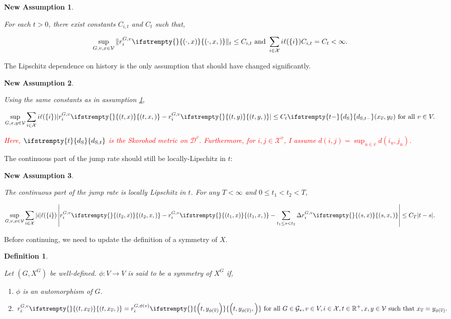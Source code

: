 \documentclass[12pt]{article}
\newcommand{\mb}{\mathbb}
\newcommand{\mc}{\mathcal}
\newcommand{\ra}{\rightarrow}
\newcommand{\ov}{\overline}
\newcommand{\te}{\text}
\newcommand{\tr}{\textcolor{red}}
\newcommand{\cad}{\mc{D}}							%
\newcommand{\valid}{\mc{V}}							%
\newcommand{\sta}{\mc{X}}							%
\newcommand{\cl}[1]{\ov{#1}}						%
\newcommand{\Xf}{X}									%
\newcommand{\Sm}{\ell}								%
\newcommand{\rate}{r}								%
\newcommand{\stmet}[1]{
\ifstrempty{#1}{
	d_{\te{S}}}{
	d_{\te{S},#1}}}									%
\newcommand{\xf}{x}									%
\newcommand{\xg}{y}									%
\newcommand{\vind}[1]{_{#1}}						%
\newcommand{\gind}[1]{^{#1}}						%
\newcommand{\stpara}[1]{_{#1}}						%
\newcommand{\gvpara}[2]{^{#1,#2}}					%
\newcommand{\jumpbd}[1]{C_{#1}}						%
\newcommand{\jumpibd}[2]{C_{#1,#2}}					%
\newcommand{\Gs}{\mc{G}_\ast}						%
\newcommand{\tmepro}[3]{
\ifstrempty{#3}{
	\left(#1,#2\right)}{
	\left(#1,#2,#3\right)}}							%
\newtheorem{defn}[thms]{Definition}
\newtheorem{nassu}{New Assumption}
\begin{document}
\begin{nassu}
\label{na::bddr}

For each \(t>0\), there exist constants \(\jumpibd{i}{t}\) and \(\jumpbd{t}\) such that,

\[\sup_{G,v,\xf\in\valid} \|\rate\gvpara{G}{v}\stpara{i}\tmepro{\cdot}{\xf}{}\|_t \leq \jumpibd{i}{t}\te{ and } \sum_{i\in\sta} i\Sm(\{i\})\jumpibd{i}{t} = \jumpbd{t} < \infty.\]
\end{nassu}

The Lipschitz dependence on history is the only assumption that should have changed significantly.

\begin{nassu}
\label{na::liprx}

Using the same constants as in assumption \ref{na::bddr},

\[\sup_{G,\xf,\xg\in \valid} \sum_{i\in\sta}i\Sm(\{i\})|\rate\gvpara{G}{v}\stpara{i}\tmepro{t}{\xf}{} - \rate\gvpara{G}{v}\stpara{i}\tmepro{t}{\xg}{}| \leq \jumpbd{t}\stmet{t-}(\xf\vind{\cl{v}},\xg\vind{\cl{v}})\te{ for all } v\in V.\]

\tr{Here, \(\stmet{t}\) is the Skorohod metric on \(\cad^{\cl{v}}\). Furthermore, for \(i,j\in\sta^{\cl{v}}\), I assume \(d(i,j) = \sup_{u\in\cl{v}} d(i_u,j_u)\).}
\end{nassu}

The continuous part of the jump rate should still be locally-Lipschitz in \(t\):

\begin{nassu}
\label{na::liprt}

The continuous part of the jump rate is locally Lipschitz in \(t\). For any \(T < \infty\) and \(0 \leq t_1 < t_2 < T\),

\[\sup_{G,v,\xf\in\valid} \sum_{i\in\sta}|i|\Sm(\{i\})\left|\rate\gvpara{G}{v}\stpara{i}\tmepro{t_2}{\xf}{} - \rate\gvpara{G}{v}\stpara{i}\tmepro{t_1}{\xf}{} - \sum_{t_1\leq s < t_2} \Delta\rate\gvpara{G}{v}\stpara{i}\tmepro{s}{\xf}{}\right| \leq \jumpbd{T}|t-s|.\] 
\end{nassu}

Before continuing, we need to update the definition of a symmetry of \(\Xf\).

\begin{defn}
\label{na::Xsim}

Let \((G,\Xf\gind{G})\) be well-defined. \(\phi:V \ra V\) is said to be a symmetry of \(\Xf\gind{G}\) if,

\begin{enumerate}
\item \(\phi\) is an automorphism of \(G\).

\item 

\[\rate\gvpara{G}{v}\stpara{i}\tmepro{t}{\xf\vind{\cl{v}}}{} = \rate\gvpara{G}{\phi(v)}\stpara{i}\tmepro{t}{\xg\vind{\phi(\cl{v})}}{} \te{ for all } G\in \Gs, v \in V,i\in \sta, t \in \mb{R}^+, \xf,\xg \in \valid\te{ such that } \xf\vind{\cl{v}} = \xg\vind{\phi(\cl{v})}.\]
\end{enumerate}
\end{defn}
\end{document}
